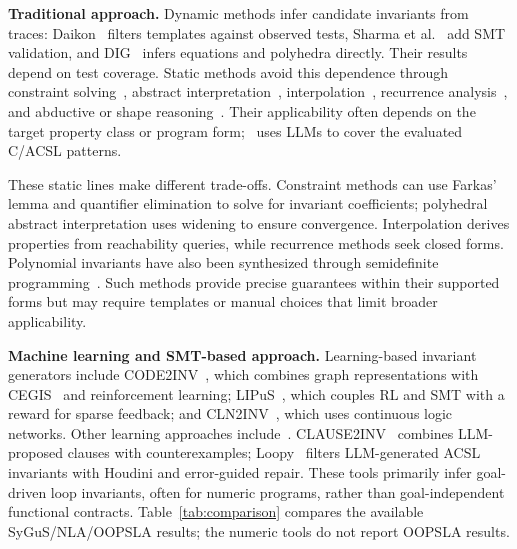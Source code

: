 




\smallskip
\noindent\textbf{Traditional approach.}
Dynamic methods infer candidate invariants from traces: Daikon~\cite{Daikon} filters templates against observed tests, Sharma et al.~\cite{A_Data_Driven_Approach_for_Algebraic_Loop} add SMT validation, and DIG~\cite{dig} infers equations and polyhedra directly. Their results depend on test coverage. Static methods avoid this dependence through constraint solving~\cite{DBLP:conf/cav/ColonSS03,DBLP:journals/pacmpl/LiuFYSL22}, abstract interpretation~\cite{Abstract_Interpretation_A_Unified_Lattice_Model_for_Static_Analysis_of_Programs_by_Construction_or_Approximation_of_Fixpoints,Automatic_Discovery_of_Linear_Restraints_among_Variables_of_a_Program}, interpolation~\cite{FiB_Squeezing_loop,DBLP:conf/cade/GanDXZKC16,Nonlinear_Craig_Interpolant_Generation}, recurrence analysis~\cite{ISSACDeepakKapur,DBLP:journals/jsc/Rodriguez-CarbonellK07,DBLP:journals/pacmpl/CyphertK24}, and abductive or shape reasoning~\cite{Inductive_Invariant_Generation_via_Abductive_Inference,Backward_Symbolic_Execution_with_Loop_Folding,SymInfer_Inferring_Numerical_Invariants_using_Symbolic_States}. Their applicability often depends on the target property class or program form; \toolname\ uses LLMs to cover the evaluated C/ACSL patterns.

These static lines make different trade-offs. Constraint methods can use
Farkas' lemma and quantifier elimination to solve for invariant coefficients;
polyhedral abstract interpretation uses widening to ensure convergence.
Interpolation derives properties from reachability queries, while recurrence
methods seek closed forms. Polynomial invariants have also been synthesized
through semidefinite programming~\cite{Synthesizing_Invariants_for_Polynomial_Programs_by_Semidefinite_Programming}.
Such methods provide precise guarantees within their supported forms but may
require templates or manual choices that limit broader applicability.

\smallskip
\noindent\textbf{Machine learning and SMT-based approach.}
Learning-based invariant generators include CODE2INV~\cite{Code2Inv_a_Deep_Learning_Framework_for_Program_Verification}, which combines graph representations with CEGIS~\cite{Counterexample_Guided_Inductive_Synthesis_Modulo_Theories} and reinforcement learning; LIPuS~\cite{Loop_Invariant_Inference_through_SMT_Solving_Enhanced_Reinforcement_Learning}, which couples RL and SMT with a reward for sparse feedback; and CLN2INV~\cite{Ryan2020CLN2INV}, which uses continuous logic networks. Other learning approaches include~\cite{iRank,Lemur,LLM_Generated_Invariants_for_Bounded_Model_Checking_Without_Loop_Unrolling}. CLAUSE2INV~\cite{DBLP:journals/pacmse/CaoWXYWCM25} combines LLM-proposed clauses with counterexamples; Loopy~\cite{kamath2023findinginductiveloopinvariants} filters LLM-generated ACSL invariants with Houdini and error-guided repair. These tools primarily infer goal-driven loop invariants, often for numeric programs, rather than goal-independent functional contracts. Table~\ref{tab:comparison} compares the available SyGuS/NLA/OOPSLA results; the numeric tools do not report OOPSLA results.

